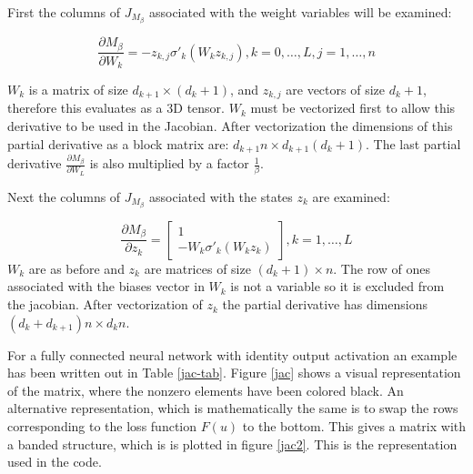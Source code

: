 First the columns of $J_{M_{\beta}}$ associated with the weight variables will be examined:
 
\begin{equation}
	\frac{\partial{M_{\beta}}}{\partial W_k} = -z_{k,j}\sigma'_k(W_kz_{k,j}), k = 0,\ldots,L, j = 1,\ldots,n
\end{equation}

$W_k$ is a matrix of size $d_{k+1}\times(d_k+1)$, and $z_{k,j}$ are vectors of size $d_k+1$, therefore this evaluates as a 3D tensor. $W_k$ must be vectorized first to allow this derivative to be used in the Jacobian. After vectorization the dimensions of this partial derivative as a block matrix are: $d_{k+1}n \times d_{k+1}(d_{k}+1)$. The last partial derivative $\frac{\partial{M_{\beta}}}{\partial W_L}$ is also multiplied by a factor $\frac{1}{\beta}$.

 Next the columns of $J_{M_{\beta}}$ associated with the states $z_k$ are examined:
 
 \begin{equation}
 	\frac{\partial{M_{\beta}}}{\partial z_k} = \begin{bmatrix} 1 \\ -W_k\sigma'_k(W_kz_k) \end{bmatrix}, k = 1,\ldots,L
 \end{equation}
 $W_k$ are as before and $z_k$ are matrices of size $(d_k+1)\times n$. The row of ones associated with the biases vector in $W_k$ is not a variable so it is excluded from the jacobian. After vectorization of $z_k$ the partial derivative has dimensions $(d_k+d_{k+1})n\times d_kn$.
 
For a fully connected neural network with identity output activation an example has been written out in Table \ref{jac-tab}. Figure \ref{jac} shows a visual representation of the matrix, where the nonzero elements have been colored black. An alternative representation, which is mathematically the same is to swap the rows corresponding to the loss function $F(u)$ to the bottom. This gives a matrix with a banded structure, which is is plotted in figure \ref{jac2}. This is the representation used in the code.

